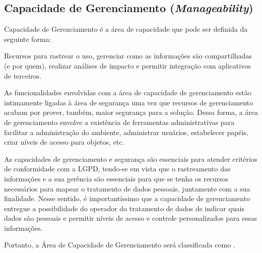 \subsection{Capacidade de Gerenciamento (\emph{Manageability})}
\label{sub-manageability}

Capacidade de Gerenciamento é a área de capacidade que pode ser definida da seguinte forma:

\begin{definition}
Recursos para rastrear o uso, gerenciar como as informações são compartilhadas (e por quem), realizar análises de impacto e permitir integração com aplicativos de terceiros.
\end{definition}

As funcionalidades envolvidas com a área de capacidade de gerenciamento estão intimamente ligadas à área de segurança uma vez que recursos de gerenciamento acabam por prover, também, maior segurança para a solução. Dessa forma, a área de gerenciamento envolve a existência de ferramentas administrativas para facilitar a administração do ambiente, administrar usuários, estabelecer papéis, criar níveis de acesso para objetos, etc.


As capacidades de gerenciamento e segurança são essenciais para atender critérios de conformidade com a LGPD, tendo-se em vista que o rastreamento das informações e a sua gerência são essenciais para que se tenha os recursos necessários para mapear o tratamento de dados pessoais, juntamente com a sua finalidade. Nesse sentido, é importantíssimo que a capacidade de gerenciamento entregue a possibilidade do operador do tratamento de dados de indicar quais dados são pessoais e permitir níveis de acesso e controle personalizados para essas informações.

Portanto,  a Área de Capacidade de Gerenciamento será classificada como \MUST.

